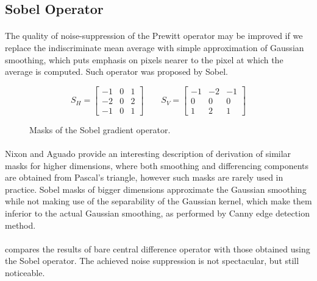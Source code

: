 \subsection{Sobel Operator}

\paragraph*{}
The quality of noise-suppression of the Prewitt operator may be improved if we replace the indiscriminate mean average with simple approximation of Gaussian smoothing, which puts emphasis on pixels nearer to the pixel at which the average is computed. Such operator was proposed by Sobel.

\begin{figure}[h!]
\begin{equation*}
S_{H} = 
	\begin{bmatrix}
	-1 & 0 & 1 \\
	-2 & 0 & 2 \\
	-1 & 0 & 1
	\end{bmatrix}\qquad
S_{V} = 
	\begin{bmatrix}
	-1 & -2 & -1 \\
	0 & 0 & 0 \\
	1 & 2 & 1
	\end{bmatrix}
\end{equation*}
\caption{Masks of the Sobel gradient operator.}
\label{fig:SobelMasks}
\end{figure}

\paragraph*{}
Nixon and Aguado provide\cite{NixonAguado08} an interesting description of derivation of similar masks for higher dimensions, where both smoothing and differencing components are obtained from Pascal's triangle, however such masks are rarely used in practice. Sobel masks of bigger dimensions approximate the Gaussian smoothing while not making use of the separability of the Gaussian kernel, which make them inferior to the actual Gaussian smoothing, as performed by Canny edge detection method.

\paragraph*{}
 compares the results of bare central difference operator with those obtained using the Sobel operator. The achieved noise suppression is not spectacular, but still noticeable.


